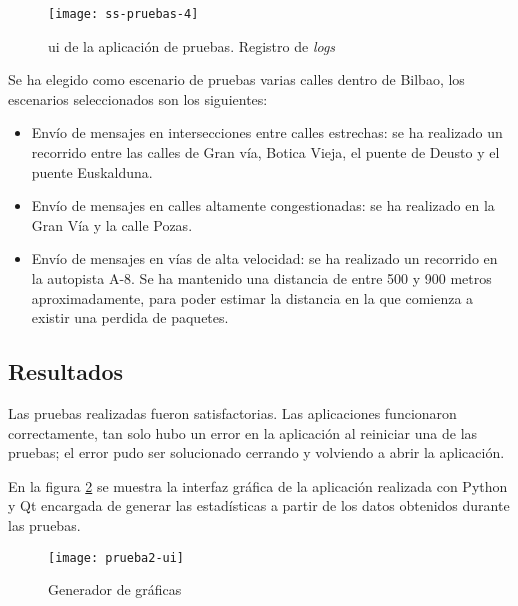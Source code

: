 \begin{figure}[H]
	\begin{center}
		\texttt{[image: ss-pruebas-4]}
		\caption{\gls{ui} de la aplicación de pruebas. Registro de \emph{logs}}
		\label{fig:ss-pruebas4}
	\end{center}
\end{figure}

Se ha elegido como escenario de pruebas varias calles dentro de Bilbao, los
escenarios seleccionados son los siguientes:
\begin{itemize}
	\item Envío de mensajes en intersecciones entre calles estrechas: se ha
	realizado un recorrido entre las calles de Gran vía, Botica Vieja, el puente
	de Deusto y el puente Euskalduna.
	\item Envío de mensajes en calles altamente congestionadas: se ha realizado
	en la Gran Vía y la calle Pozas.
	\item Envío de mensajes en vías de alta velocidad: se ha realizado un
	recorrido en la	autopista A-8. Se ha mantenido una distancia de entre 500 y
	900 metros aproximadamente, para poder estimar la distancia en la que
	comienza a existir una perdida de paquetes.
\end{itemize}

\FloatBarrier
\subsection{Resultados}
Las pruebas realizadas fueron satisfactorias. Las aplicaciones funcionaron
correctamente, tan solo hubo un error en la aplicación al reiniciar una de las
pruebas; el error pudo ser solucionado cerrando y volviendo a abrir la
aplicación.

En la figura \ref{fig:prueba2-ui} se muestra la interfaz gráfica de la
aplicación realizada con Python y Qt encargada de generar las estadísticas a
partir de los datos obtenidos durante las pruebas.

\begin{figure}[H]
	\begin{center}
		\texttt{[image: prueba2-ui]}
		\caption{Generador de gráficas}
		\label{fig:prueba2-ui}
	\end{center}
\end{figure}
